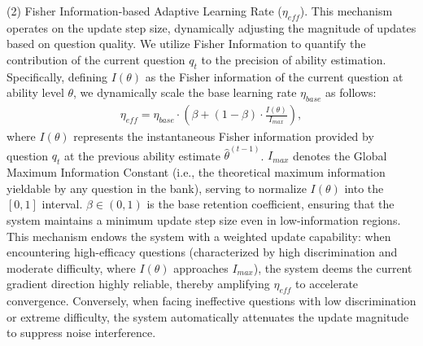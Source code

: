 (2) Fisher Information-based Adaptive Learning Rate ($\eta_{eff}$). This mechanism operates on the update step size, dynamically adjusting the magnitude of updates based on question quality. We utilize Fisher Information to quantify the contribution of the current question $q_t$ to the precision of ability estimation. Specifically, defining $I(\theta)$ as the Fisher information of the current question at ability level $\theta$, we dynamically scale the base learning rate $\eta_{base}$ as follows:
\begin{align}
    \eta_{eff} = \eta_{base} \cdot \left( \beta + (1-\beta) \cdot \frac{I(\theta)}{I_{max}} \right),
\end{align}
where $I(\theta)$ represents the instantaneous Fisher information provided by question $q_t$ at the previous ability estimate $\hat{\theta}^{(t-1)}$. $I_{max}$ denotes the Global Maximum Information Constant (i.e., the theoretical maximum information yieldable by any question in the bank), serving to normalize $I(\theta)$ into the $[0, 1]$ interval. $\beta \in (0, 1)$ is the base retention coefficient, ensuring that the system maintains a minimum update step size even in low-information regions. This mechanism endows the system with a weighted update capability: when encountering high-efficacy questions (characterized by high discrimination and moderate difficulty, where $I(\theta)$ approaches $I_{max}$), the system deems the current gradient direction highly reliable, thereby amplifying $\eta_{eff}$ to accelerate convergence. Conversely, when facing ineffective questions with low discrimination or extreme difficulty, the system automatically attenuates the update magnitude to suppress noise interference.

